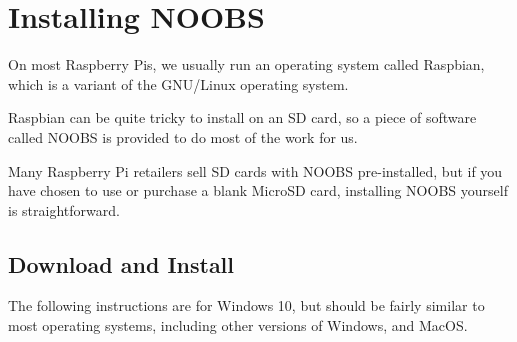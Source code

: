 \section{Installing NOOBS}
\label{sec:NOOBS}

	On most Raspberry Pis, we usually run an operating system called Raspbian, which is a variant of the GNU/Linux operating system.
	
	
	Raspbian can be quite tricky to install on an SD card, so a piece of software called NOOBS is provided to do most of the work for us.
	
	Many Raspberry Pi retailers sell SD cards with NOOBS pre-installed, but if you have chosen to use or purchase a blank MicroSD card, installing NOOBS yourself is straightforward.

	\subsection{Download and Install}
	
	The following instructions are for Windows 10, but should be fairly similar to most operating systems, including other versions of Windows, and MacOS.
		

